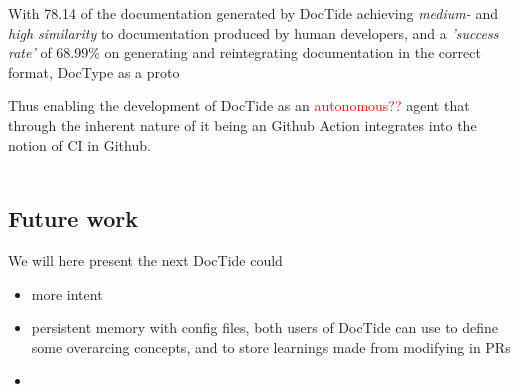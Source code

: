 With 78.14\‰ of the documentation generated by DocTide achieving \textit{medium-} and \textit{high similarity} to documentation produced by human developers, and a \textit{'success rate'} of 68.99\% on generating and reintegrating documentation in the correct format, DocType as a proto




Thus enabling the development of DocTide as an \textcolor{red}{autonomous??} agent that through the inherent nature of it being an Github Action integrates into the notion of CI in Github. 
\\\\


\subsection{Future work}
We will here present the next DocTide could 
\begin{itemize}
    \item more intent 
        \item persistent memory with config files, both users of DocTide can use to define some overarcing concepts, and to store learnings made from modifying in PRs
        \item 
\end{itemize}